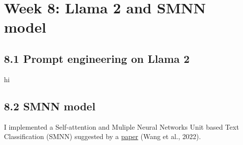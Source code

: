 \section*{Week 8: Llama 2 and SMNN model}

\subsection*{8.1 Prompt engineering on Llama 2}
hi

\subsection*{8.2 SMNN model}
I implemented a Self-attention and Muliple Neural Networks Unit based Text Classification (SMNN) suggested by a \href{https://ceur-ws.org/Vol-3304/paper30.pdf}{paper} (Wang et al., 2022).